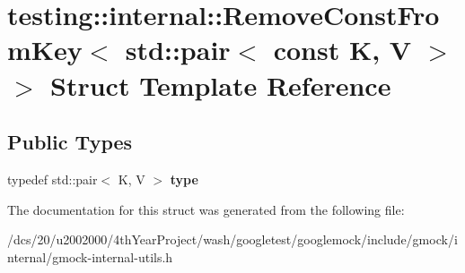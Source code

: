 \hypertarget{structtesting_1_1internal_1_1RemoveConstFromKey_3_01std_1_1pair_3_01const_01K_00_01V_01_4_01_4}{}\section{testing\+:\+:internal\+:\+:Remove\+Const\+From\+Key$<$ std\+:\+:pair$<$ const K, V $>$ $>$ Struct Template Reference}
\label{structtesting_1_1internal_1_1RemoveConstFromKey_3_01std_1_1pair_3_01const_01K_00_01V_01_4_01_4}
\subsection*{Public Types}
\begin{DoxyCompactItemize}
\item 
\mbox{\label{structtesting_1_1internal_1_1RemoveConstFromKey_3_01std_1_1pair_3_01const_01K_00_01V_01_4_01_4_ac1d76274964aa8172889a4714246e86f}} 
typedef std\+::pair$<$ K, V $>$ {\bfseries type}
\end{DoxyCompactItemize}


The documentation for this struct was generated from the following file\+:\begin{DoxyCompactItemize}
\item 
/dcs/20/u2002000/4th\+Year\+Project/wash/googletest/googlemock/include/gmock/internal/gmock-\/internal-\/utils.\+h\end{DoxyCompactItemize}
